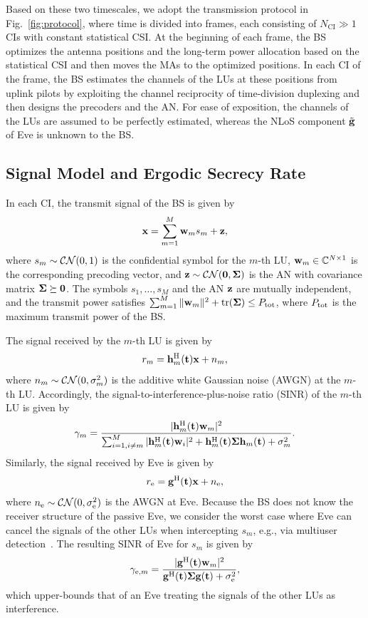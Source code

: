 \documentclass[journal]{IEEEtran}
\begin{document}
Based on these two timescales, we adopt the transmission protocol in Fig.~\ref{fig:protocol}, where time is divided into frames, each consisting of $N_{\mathrm{CI}}\gg1$ CIs with constant statistical CSI. At the beginning of each frame, the BS optimizes the antenna positions and the long-term power allocation based on the statistical CSI and then moves the MAs to the optimized positions. In each CI of the frame, the BS estimates the channels of the LUs at these positions from uplink pilots by exploiting the channel reciprocity of time-division duplexing and then designs the precoders and the AN. For ease of exposition, the channels of the LUs are assumed to be perfectly estimated, whereas the NLoS component $\tilde{\mathbf{g}}$ of Eve is unknown to the BS.

\subsection{Signal Model and Ergodic Secrecy Rate}

In each CI, the transmit signal of the BS is given by
\begin{equation}\label{eq:x}
\mathbf{x}=\sum_{m=1}^{M}\mathbf{w}_m s_m+\mathbf{z},
\end{equation}
where $s_m\sim\mathcal{CN}(0,1)$ is the confidential symbol for the $m$-th LU, $\mathbf{w}_m\in\mathbb C^{N\times1}$ is the corresponding precoding vector, and $\mathbf{z}\sim\mathcal{CN}(\mathbf 0,\boldsymbol{\Sigma})$ is the AN with covariance matrix $\boldsymbol{\Sigma}\succeq\mathbf 0$. The symbols $s_1,\ldots,s_M$ and the AN $\mathbf{z}$ are mutually independent, and the transmit power satisfies $\sum_{m=1}^M\|\mathbf{w}_m\|^2+\mathrm{tr}(\boldsymbol{\Sigma})\le P_{\mathrm{tot}}$, where $P_{\mathrm{tot}}$ is the maximum transmit power of the BS.

The signal received by the $m$-th LU is given by
\begin{equation}\label{eq:ym}
r_m=\mathbf{h}_m^{\mathrm H}(\mathbf{t})\mathbf{x}+n_m,
\end{equation}
where $n_m\sim\mathcal{CN}(0,\sigma_m^2)$ is the additive white Gaussian noise (AWGN) at the $m$-th LU. Accordingly, the signal-to-interference-plus-noise ratio (SINR) of the $m$-th LU is given by
\begin{equation}\label{eq:sinr_gen}
\gamma_m=\frac{|\mathbf{h}_m^{\mathrm H}(\mathbf{t})\mathbf{w}_m|^2}{\sum_{i=1,i\neq m}^{M}|\mathbf{h}_m^{\mathrm H}(\mathbf{t})\mathbf{w}_i|^2+\mathbf{h}_m^{\mathrm H}(\mathbf{t})\boldsymbol{\Sigma}\mathbf{h}_m(\mathbf{t})+\sigma_m^2}.
\end{equation}
Similarly, the signal received by Eve is given by
\begin{equation}\label{eq:ye}
r_{\mathrm e}=\mathbf{g}^{\mathrm H}(\mathbf{t})\mathbf{x}+n_{\mathrm e},
\end{equation}
where $n_{\mathrm e}\sim\mathcal{CN}(0,\sigma_{\mathrm e}^2)$ is the AWGN at Eve. Because the BS does not know the receiver structure of the passive Eve, we consider the worst case where Eve can cancel the signals of the other LUs when intercepting $s_m$, e.g., via multiuser detection~\cite{ZhuTWC2014}. The resulting SINR of Eve for $s_m$ is given by
\begin{equation}\label{eq:sinre_gen}
\gamma_{\mathrm{e},m}=\frac{|\mathbf{g}^{\mathrm H}(\mathbf{t})\mathbf{w}_m|^2}{\mathbf{g}^{\mathrm H}(\mathbf{t})\boldsymbol{\Sigma}\mathbf{g}(\mathbf{t})+\sigma_{\mathrm e}^2},
\end{equation}
which upper-bounds that of an Eve treating the signals of the other LUs as interference.
\end{document}
